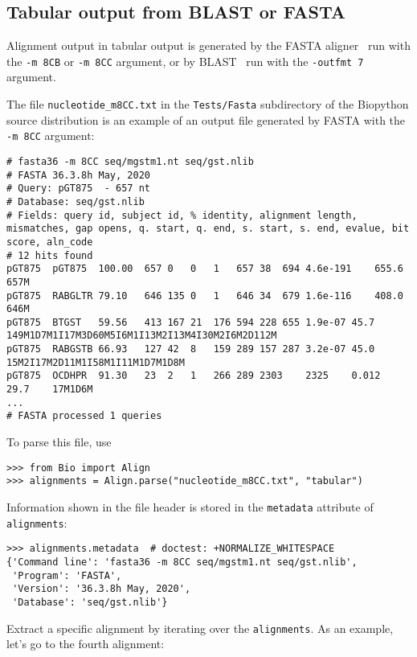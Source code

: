\subsection{Tabular output from BLAST or FASTA}
\label{subsec:align_tabular}

Alignment output in tabular output is generated by the FASTA aligner~\cite{pearson1988} run with the \verb|-m 8CB| or  \verb|-m 8CC| argument, or by BLAST~\cite{altschul1990} run with the \verb|-outfmt 7| argument.

The file \verb|nucleotide_m8CC.txt| in the \verb|Tests/Fasta| subdirectory of the Biopython source distribution is an example of an output file generated by FASTA with the \verb|-m 8CC| argument:
\begin{verbatim}
# fasta36 -m 8CC seq/mgstm1.nt seq/gst.nlib
# FASTA 36.3.8h May, 2020
# Query: pGT875  - 657 nt
# Database: seq/gst.nlib
# Fields: query id, subject id, % identity, alignment length, mismatches, gap opens, q. start, q. end, s. start, s. end, evalue, bit score, aln_code
# 12 hits found
pGT875	pGT875	100.00	657	0	0	1	657	38	694	4.6e-191	655.6	657M
pGT875	RABGLTR	79.10	646	135	0	1	646	34	679	1.6e-116	408.0	646M
pGT875	BTGST	59.56	413	167	21	176	594	228	655	1.9e-07	45.7	149M1D7M1I17M3D60M5I6M1I13M2I13M4I30M2I6M2D112M
pGT875	RABGSTB	66.93	127	42	8	159	289	157	287	3.2e-07	45.0	15M2I17M2D11M1I58M1I11M1D7M1D8M
pGT875	OCDHPR	91.30	23	2	1	266	289	2303	2325	0.012	29.7	17M1D6M
...
# FASTA processed 1 queries
\end{verbatim}
To parse this file, use
\begin{verbatim}
>>> from Bio import Align
>>> alignments = Align.parse("nucleotide_m8CC.txt", "tabular")
\end{verbatim}
Information shown in the file header is stored in the \verb|metadata| attribute of \verb|alignments|:
\begin{verbatim}
>>> alignments.metadata  # doctest: +NORMALIZE_WHITESPACE
{'Command line': 'fasta36 -m 8CC seq/mgstm1.nt seq/gst.nlib',
 'Program': 'FASTA',
 'Version': '36.3.8h May, 2020',
 'Database': 'seq/gst.nlib'}
\end{verbatim}
Extract a specific alignment by iterating over the \verb|alignments|. As an example, let's go to the fourth alignment:
